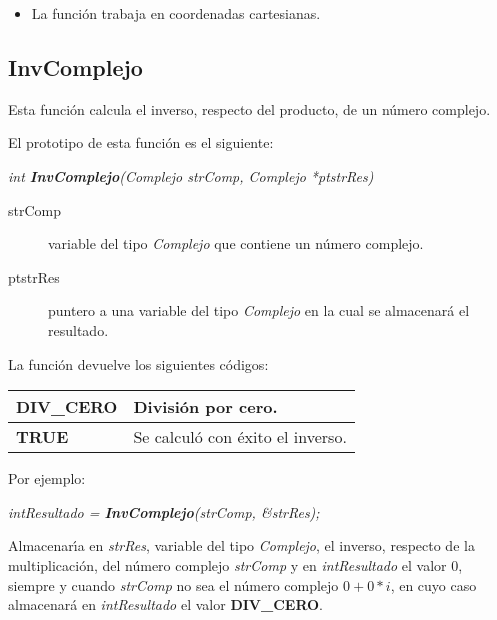 \begin{itemize}
\item La funci\'on trabaja en coordenadas cartesianas.
\end{itemize}

\subsection{InvComplejo}
Esta funci\'on calcula el inverso, respecto del producto, de un 
n\'umero complejo.\newline

El prototipo de esta funci\'on es el siguiente:

\begin{center}
\emph{int \textbf{InvComplejo}(Complejo strComp, Complejo *ptstrRes)}
\end{center}

\begin{description}
\item[strComp] variable del tipo \emph{Complejo} que contiene un n\'umero 
complejo.
\item[ptstrRes] puntero a una variable del tipo \emph{Complejo} en la cual se
almacenar\'a el resultado.
\end{description}

La funci\'on devuelve los siguientes c\'odigos:

\begin{center}
\begin{tabular}{|l|l|}
\hline
\textbf{DIV\_CERO} & Divisi\'on por cero. \\
\hline
\textbf{TRUE} & Se calcul\'o con \'exito el inverso. \\
\hline
\end{tabular}
\end{center}

\newpage

Por ejemplo:

\begin{center}
\emph{intResultado = \textbf{InvComplejo}(strComp, \&strRes);}
\end{center}

Almacenar\'{\i}a en \emph{strRes}, variable del tipo \emph{Complejo}, el
inverso, respecto de la multiplicaci\'on, del n\'umero complejo \emph{strComp} 
y en \emph{intResultado} el valor $0$, siempre y cuando \emph{strComp} no sea
el n\'umero complejo $0+0*i$, en cuyo caso almacenar\'a en \emph{intResultado} 
el valor \textbf{DIV\_CERO}.\\

